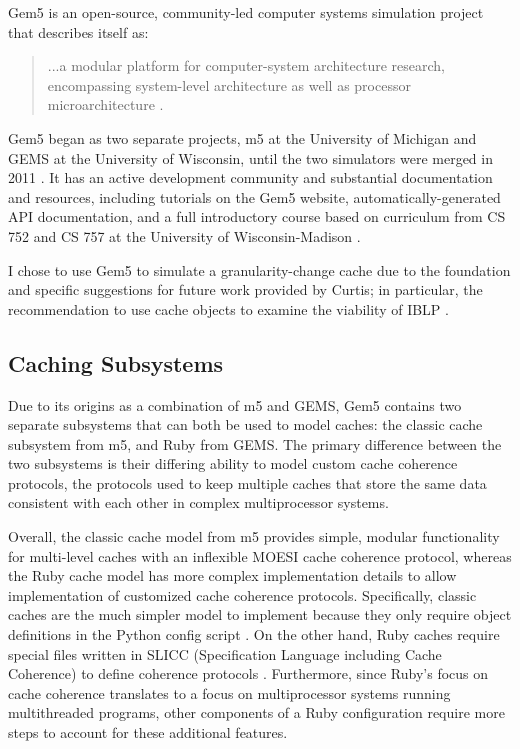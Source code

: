 \documentclass[12pt,twoside]{reedthesis}
\begin{document}
Gem5 is an open-source, community-led computer systems simulation project that describes itself as: \begin{quote}
	...a modular platform for computer-system architecture research, encompassing system-level architecture as well as processor microarchitecture \cite{gem5-about}.
\end{quote}

Gem5 began as two separate projects, m5 at the University of Michigan and GEMS at the University of Wisconsin, until the two simulators were merged in 2011 \cite{gem5-about}. It has an active development community and substantial documentation and resources, including tutorials on the Gem5 website, automatically-generated API documentation, and a full introductory course based on curriculum from CS 752 and CS 757 at the University of Wisconsin-Madison \cite{gem5-docs}.

I chose to use Gem5 to simulate a granularity-change cache due to the foundation and specific suggestions for future work provided by Curtis; in particular, the recommendation to use cache objects to examine the viability of IBLP \cite{curtis}.

	\subsection*{Caching Subsystems}

	Due to its origins as a combination of m5 and GEMS, Gem5 contains two separate subsystems that can both be used to model caches: the classic cache subsystem from m5, and Ruby from GEMS. The primary difference between the two subsystems is their differing ability to model custom cache coherence protocols, the protocols used to keep multiple caches that store the same data consistent with each other in complex multiprocessor systems.

	Overall, the classic cache model from m5 provides simple, modular functionality for multi-level caches with an inflexible MOESI cache coherence protocol, whereas the Ruby cache model has more complex implementation details to allow implementation of customized cache coherence protocols. Specifically, classic caches are the much simpler model to implement because they only require object definitions in the Python config script \cite{gem5-tutorial}. On the other hand, Ruby caches require special files written in SLICC (Specification Language including Cache Coherence) to define coherence protocols \cite{gem5-ruby}. Furthermore, since Ruby's focus on cache coherence translates to a focus on multiprocessor systems running multithreaded programs, other components of a Ruby configuration require more steps to account for these additional features.
\end{document}
